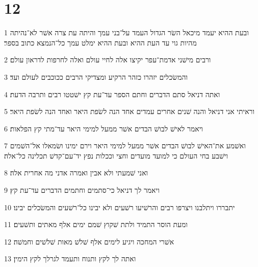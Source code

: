 \chapter{12}

\par 1 ובעת ההיא יעמד מיכאל השׂר הגדול העמד על־בני עמך והיתה עת צרה אשׁר לא־נהיתה מהיות גוי עד העת ההיא ובעת ההיא ימלט עמך כל־הנמצא כתוב בספר׃
\par 2 ורבים מישׁני אדמת־עפר יקיצו אלה לחיי עולם ואלה לחרפות לדראון עולם׃
\par 3 והמשׂכלים יזהרו כזהר הרקיע ומצדיקי הרבים ככוכבים לעולם ועד׃
\par 4 ואתה דניאל סתם הדברים וחתם הספר עד־עת קץ ישׁטטו רבים ותרבה הדעת׃
\par 5 וראיתי אני דניאל והנה שׁנים אחרים עמדים אחד הנה לשׂפת היאר ואחד הנה לשׂפת היאר׃
\par 6 ויאמר לאישׁ לבושׁ הבדים אשׁר ממעל למימי היאר עד־מתי קץ הפלאות׃
\par 7 ואשׁמע את־האישׁ לבושׁ הבדים אשׁר ממעל למימי היאר וירם ימינו ושׂמאלו אל־השׁמים וישׁבע בחי העולם כי למועד מועדים וחצי וככלות נפץ יד־עם־קדשׁ תכלינה כל־אלה׃
\par 8 ואני שׁמעתי ולא אבין ואמרה אדני מה אחרית אלה׃
\par 9 ויאמר לך דניאל כי־סתמים וחתמים הדברים עד־עת קץ׃
\par 10 יתבררו ויתלבנו ויצרפו רבים והרשׁיעו רשׁעים ולא יבינו כל־רשׁעים והמשׂכלים יבינו׃
\par 11 ומעת הוסר התמיד ולתת שׁקוץ שׁמם ימים אלף מאתים ותשׁעים׃
\par 12 אשׁרי המחכה ויגיע לימים אלף שׁלשׁ מאות שׁלשׁים וחמשׁה׃
\par 13 ואתה לך לקץ ותנוח ותעמד לגרלך לקץ הימין׃


